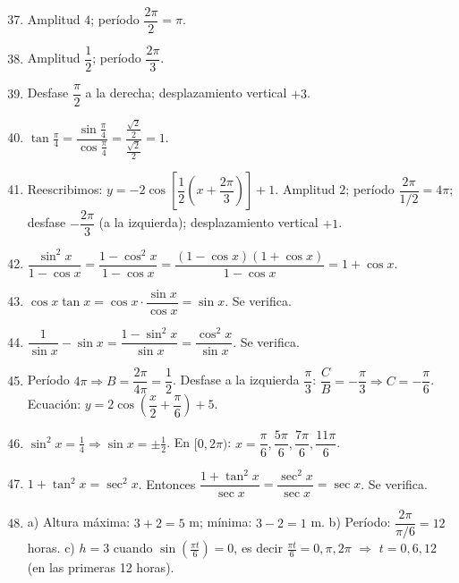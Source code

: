 \documentclass[12pt, a4paper]{article}
\begin{document}
\begin{enumerate}[leftmargin=*, label=\textbf{\arabic*.}]
  \setcounter{enumi}{36}
  \item Amplitud $4$; período $\dfrac{2\pi}{2} = \pi$.
  \item Amplitud $\dfrac{1}{2}$; período $\dfrac{2\pi}{3}$.
  \item Desfase $\dfrac{\pi}{2}$ a la derecha; desplazamiento vertical $+3$.
  \item $\tan\frac{\pi}{4} = \dfrac{\sin\frac{\pi}{4}}{\cos\frac{\pi}{4}} = \dfrac{\frac{\sqrt{2}}{2}}{\frac{\sqrt{2}}{2}} = 1$.
  \item Reescribimos: $y = -2\cos\left[\dfrac{1}{2}\left(x + \dfrac{2\pi}{3}\right)\right] + 1$. Amplitud $2$; período $\dfrac{2\pi}{1/2} = 4\pi$; desfase $-\dfrac{2\pi}{3}$ (a la izquierda); desplazamiento vertical $+1$.
  \item $\dfrac{\sin^2 x}{1 - \cos x} = \dfrac{1 - \cos^2 x}{1 - \cos x} = \dfrac{(1 - \cos x)(1 + \cos x)}{1 - \cos x} = 1 + \cos x$.
  \item $\cos x \tan x = \cos x \cdot \dfrac{\sin x}{\cos x} = \sin x$. Se verifica.
  \item $\dfrac{1}{\sin x} - \sin x = \dfrac{1 - \sin^2 x}{\sin x} = \dfrac{\cos^2 x}{\sin x}$. Se verifica.
  \item Período $4\pi \Rightarrow B = \dfrac{2\pi}{4\pi} = \dfrac{1}{2}$. Desfase a la izquierda $\dfrac{\pi}{3}$: $\dfrac{C}{B} = -\dfrac{\pi}{3} \Rightarrow C = -\dfrac{\pi}{6}$. Ecuación: $y = 2\cos\left(\dfrac{x}{2} + \dfrac{\pi}{6}\right) + 5$.
  \item $\sin^2 x = \frac{1}{4} \Rightarrow \sin x = \pm \frac{1}{2}$. En $[0, 2\pi)$: $x = \dfrac{\pi}{6}, \dfrac{5\pi}{6}, \dfrac{7\pi}{6}, \dfrac{11\pi}{6}$.
  \item $1 + \tan^2 x = \sec^2 x$. Entonces $\dfrac{1 + \tan^2 x}{\sec x} = \dfrac{\sec^2 x}{\sec x} = \sec x$. Se verifica.
  \item a) Altura máxima: $3 + 2 = 5$ m; mínima: $3 - 2 = 1$ m. \quad b) Período: $\dfrac{2\pi}{\pi/6} = 12$ horas. \quad c) $h = 3$ cuando $\sin\left(\frac{\pi t}{6}\right) = 0$, es decir $\frac{\pi t}{6} = 0, \pi, 2\pi$ $\Rightarrow$ $t = 0, 6, 12$ (en las primeras 12 horas).
\end{enumerate}
\end{document}
